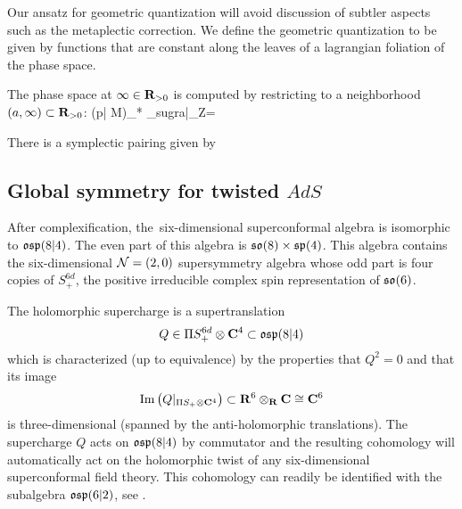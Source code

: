 Our ansatz for geometric quantization will avoid discussion of subtler aspects such as the metaplectic correction. We define the geometric quantization to be given by functions that are constant along the leaves of a lagrangian foliation of the phase space.

The phase space at $\infty\in \mathbf{R}_{>0}$ is computed by restricting to a neighborhood $(a, \infty)\subset \mathbf{R}_{>0}$:
\beqn
(p| \mathring M)_* \cL_{sugra}|_{\infty \times Z}=
\eeqn

There is a symplectic pairing given by
\beqn
\eeqn



\subsection{Global symmetry for twisted $AdS$}
\label{s:global1}

After complexification, the~six-dimensional superconformal algebra is isomorphic to $\mathfrak{osp}(8|4)$.
The even part of this algebra is $\mathfrak{so}(8) \times \mathfrak{sp}(4)$.
This algebra contains the six-dimensional $\mathcal N=(2,0)$ supersymmetry algebra whose odd part is four copies of $S^{6d}_+$, the positive irreducible complex spin representation of $\mathfrak{so}(6)$.

The holomorphic supercharge is a supertranslation
\[
Q \in \Pi S^{6d}_+ \otimes \mathbf{C}^4 \subset \mathfrak{osp}(8|4)
\]
which is characterized (up to equivalence) by the properties that $Q^2 = 0$ and that its image
\[
{\rm Im}\left(Q|_{\Pi S_+ \otimes \mathbf{C}^4} \right) \subset \mathbf{R}^6 \otimes_{\mathbf{R}} \mathbf{C} \cong \mathbf{C}^6
\]
is three-dimensional (spanned by the anti-holomorphic translations). 
The supercharge $Q$ acts on $\mathfrak{osp}(8|4)$ by commutator and the resulting cohomology will automatically act on the holomorphic twist of any six-dimensional superconformal field theory. 
This cohomology can readily be identified with the subalgebra $\mathfrak{osp}(6|2)$, see \cite{SWsuco2}. 


